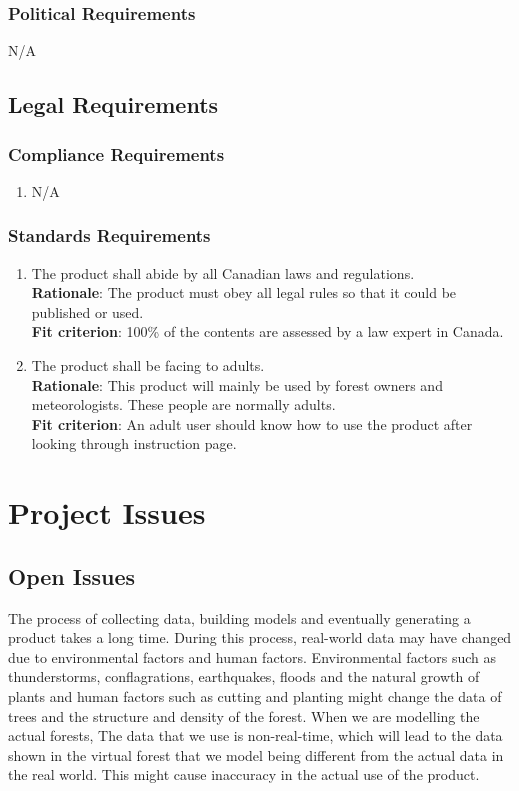 \documentclass{article}
\begin{document}
\subsubsection{Political Requirements}
N/A
\subsection{Legal Requirements}
\subsubsection{Compliance Requirements}
\begin{enumerate}[LR1.1]
    \item N/A
\end{enumerate}
\subsubsection{Standards Requirements}
\begin{enumerate}[LR2.1]
    \item The product shall abide by all Canadian laws and regulations.\\
    \textbf{Rationale}: The product must obey all legal rules so that it could be published or used.\\
    \textbf{Fit criterion}: 100\% of the contents are assessed by a law expert in Canada.\\
    \item The product shall be facing to adults.\\
    \textbf{Rationale}: This product will mainly be used by forest 
    owners and meteorologists. These people are normally adults. \\ 
    \textbf{Fit criterion}: An adult user should know how to use
    the product after looking through instruction page.\\
\end{enumerate}

\section{Project Issues}
\subsection{Open Issues}
The process of collecting data, building models and eventually generating a product takes a long time. During this process, real-world data may have changed due to environmental factors and human factors. Environmental factors such as thunderstorms, conflagrations, earthquakes, floods and the natural growth of plants and human factors such as cutting and planting might change the data of trees and the structure and density of the forest. When we are modelling the actual forests, The data that we use is non-real-time, which will lead to the data shown in the virtual forest that we model being different from the actual data in the real world. This might cause inaccuracy in the actual use of the product.
\end{document}
